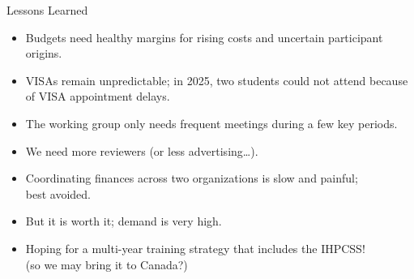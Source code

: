 \documentclass[
  11pt,
  ignorenonframetext,
  aspectratio=169]{beamer}
\begin{document}
\begin{frame}{Lessons Learned}
\label{lessons-learned}
\pause

\begin{itemize}
\item
  Budgets need healthy margins for rising costs and uncertain participant origins.

  \pause
\item
  VISAs remain unpredictable; in 2025, two students could not attend because of VISA appointment delays.

  \pause
\item
  The working group only needs frequent meetings during a few key periods.

  \pause
\item
  We need more reviewers (or less advertising\ldots).

  \pause
\item
  Coordinating finances across two organizations is slow and painful;\\
  best avoided.
\end{itemize}

\pause

\begin{block}{}\setlength{\parskip}{0.5\baselineskip}
\label{section}
\begin{itemize}
\item
  But it is worth it; demand is very high.

  \pause
\item
  Hoping for a multi-year training strategy that includes the IHPCSS!\\
  (so we may bring it to Canada?)
\end{itemize}
\end{block}
\end{frame}
\end{document}

